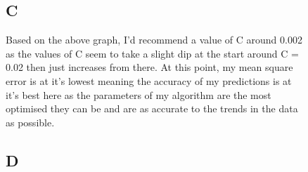 \documentclass[11pt]{article} %
\begin{document}
\begin{figure}[h]
\subsection{C}
Based on the above graph, I'd recommend a value of C around 0.002 as the values of C seem to take a slight dip at the start around C = 0.02 then just increases from there. At this point, my mean square error is at it's lowest meaning the accuracy of my predictions is at it's best here as the parameters of my algorithm are the most optimised they can be and are as accurate to the trends in the data as possible.
\subsection{D}

\end{figure}
\end{document}
